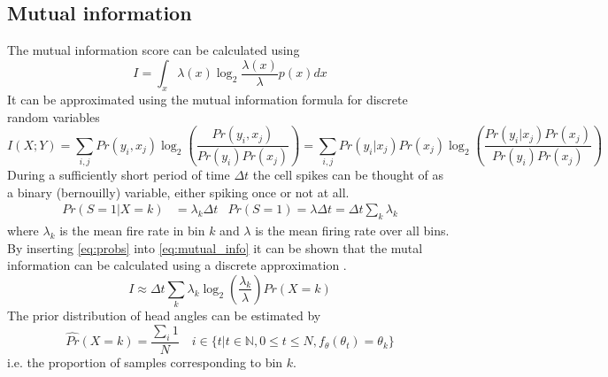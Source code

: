 \subsection{Mutual information}
The mutual information score can be calculated using 
\begin{equation} \label{eq:mutinfo_cont}
    I = \int_x \lambda(x) \log_2{\frac{\lambda(x)}{\lambda}}p(x) dx
\end{equation}
It can be approximated using the mutual information formula for discrete random variables
\begin{equation}\label{eq:mutual_info}
    I(X;Y) = \sum_{i, j} Pr(y_i,x_j) \log_2(\frac{Pr(y_i, x_j)}{Pr(y_i)Pr(x_j)}) = \sum_{i,j}Pr(y_i|x_j)Pr(x_j) \log_2(\frac{Pr(y_i | x_j)Pr(x_j)}{Pr(y_i)Pr(x_j)})
\end{equation}
During a sufficiently short period of time $\Delta t$ the cell spikes can be thought of as a binary (bernouilly) variable, either spiking once or not at all. \cite{mutualinfo}
\begin{align} \label{eq:probs}
    Pr(S=1 | X = k) &= \lambda_k \Delta t & Pr(S=1) = \lambda \Delta t = \Delta t \sum_k \lambda_k
\end{align}
where $\lambda_k$ is the mean fire rate in bin $k$ and $\lambda$ is the mean firing rate over all bins.
By inserting \cref{eq:probs} into \cref{eq:mutual_info} it can be shown that the mutal information can be calculated using a discrete approximation \cite{mutualinfo}.
\begin{equation} \label{eq:mutinfo_disc}
    I \approx \Delta t \sum_k \lambda_k \log_2(\frac{\lambda_k}{\lambda})Pr(X = k)
\end{equation}
The prior distribution of head angles can be estimated by
\begin{equation}
    \hat{Pr}(X = k) = \frac{\sum_i 1}{N}  \quad i \in \{t | t \in \mathbb{N}, 0 \leq t \leq N, f_\theta(\theta_t) = \theta_k\}
\end{equation}
i.e. the proportion of samples corresponding to bin $k$.
